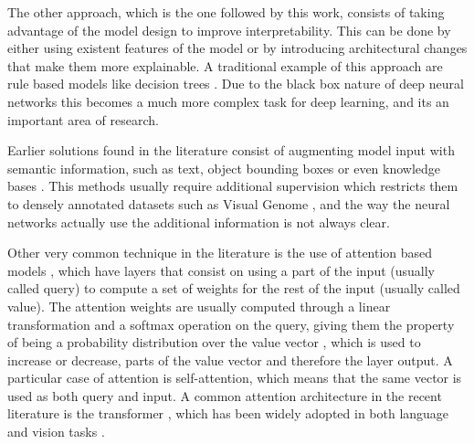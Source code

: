 The other approach, which is the one followed by this work, consists of taking advantage of the model
design to improve interpretability. This can be done by either using existent features of the model
or by introducing architectural changes that make them more explainable. A traditional  example of
this approach are rule based models like  decision trees \cite{breiman_tree}. Due to the black box
nature of deep neural networks this becomes a much more complex task for deep learning, and its an
important area of research.

Earlier solutions found in the literature consist of augmenting
model input with semantic information, such as text, object bounding boxes or even knowledge bases
\cite{dong_semantic, zhuo_video, li_knowledge}. This methods usually require additional supervision
which restricts them to densely annotated datasets such as Visual Genome \cite{krishna_visualgenome},
and the way the neural networks actually  use the additional information is not always clear.

Other very common technique in the literature is the use of attention based models \cite{bahdanau_attention},
which have layers that consist on using a part of the input (usually called query) to compute a set of weights
for the rest of the input (usually called value). The attention weights are usually computed through
a linear transformation and a softmax operation on the query, giving them the property of being a probability
distribution over the value vector \cite{cordonnier_relationship}, which is used to increase or decrease,
parts of the value vector and therefore the layer output. A particular case of attention is
self-attention, which means that the same vector is used as both query and input. A common attention architecture
in the recent literature is the transformer \cite{vaswani_attention}, which has been widely adopted in both
language and vision tasks \cite{devlin_bert, radford_gpt, bello_attention, li_visualbert, carion_object}.

